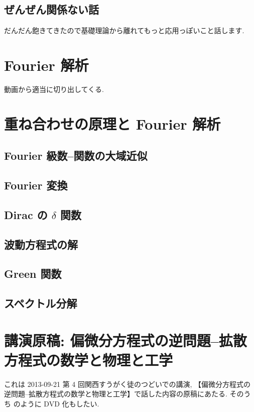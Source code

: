 \documentclass[openany, a4paper, oneside]{jsbook}
\begin{document}
\section{ぜんぜん関係ない話}

だんだん飽きてきたので基礎理論から離れてもっと応用っぽいこと話します.
\chapter{Fourier 解析}

動画から適当に切り出してくる.
\chapter{重ね合わせの原理と Fourier 解析}

\section{Fourier 級数--関数の大域近似}

\section{Fourier 変換}

\section{Dirac の $\delta$ 関数}

\section{波動方程式の解}

\section{Green 関数}

\section{スペクトル分解}

\chapter{講演原稿: 偏微分方程式の逆問題--拡散方程式の数学と物理と工学\label{inverse-problem-in-partial-diferrential-equations-for-diffusion-equation-for-tsudoi1}}

これは 2013-09-21 第 4 回関西すうがく徒のつどいでの講演,
【偏微分方程式の逆問題--拡散方程式の数学と物理と工学】で話した内容の原稿にあたる.
そのうち \cite{phasetr1} のように DVD 化もしたい.
\end{document}
